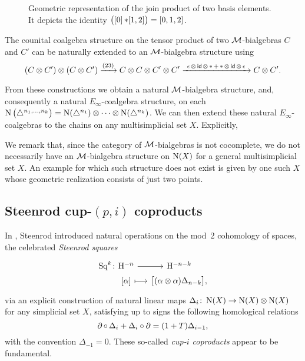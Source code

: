 \begin{figure}
	
	\caption{Geometric representation of the join product of two basis elements. It depicts the identity $\big([0] \operatorname{\ast} [1,2]\big) = [0,1,2]$.}
	\label{f:join of faces}
\end{figure}

The counital coalgebra structure on the tensor product of two $\mathcal{M}$-bialgebras $C$ and $C'$ can be naturally extended to an $\mathcal{M}$-bialgebra structure using
\[
(C \otimes C^\prime) \otimes (C \otimes C^\prime) \xrightarrow{(23)}
C \otimes C \otimes C^\prime \otimes C^\prime
\xrightarrow{\ \operatorname{\epsilon} \otimes \, \mathsf{id} \, \otimes \, \operatorname{\ast} + \operatorname{\ast} \otimes \, \mathsf{id} \, \otimes \,\operatorname{\epsilon}\ }
C \otimes C^\prime.
\]

From these constructions we obtain a natural $\mathcal{M}$-bialgebra structure, and, consequently a natural $E_\infty$-coalgebra structure, on each $\operatorname{N} \big( \triangle^{n_1, \dots, n_k} \big) = \operatorname{N}(\triangle^{n_1}) \otimes \dotsb \otimes \operatorname{N}(\triangle^{n_k})$.
We can then extend these natural $E_\infty$-coalgebras to the chains on any multisimplicial set $X$.
Explicitly, 

We remark that, since the category of $\mathcal{M}$-bialgebras is not cocomplete, we do not necessarily have an $\mathcal{M}$-bialgebra structure on $\operatorname{N}(X)$ for a general multisimplicial set $X$.
An example for which such structure does not exist is given by one such $X$ whose geometric realization consists of just two points.

\subsection{Steenrod cup-$(p,i)$ coproducts} \label{ss:cup coproducts}

In \cite{steenrod1947products}, Steenrod introduced natural operations on the mod~2 cohomology of spaces, the celebrated \textit{Steenrod squares}
\[
\begin{tikzcd} [column sep=small, row sep=0]
	\Sq^k \colon &[-20] \rH^{-n} \arrow[r] & \rH^{-n-k} \\ &
	{[\alpha]} \arrow[r, mapsto] & \big[ (\alpha \ot \alpha) \Delta_{n-k} \big],
\end{tikzcd}
\]
via an explicit construction of natural linear maps $\Delta_i \colon \operatorname{N}(X) \to \operatorname{N}(X) \otimes \operatorname{N}(X)$ for any simplicial set $X$, satisfying up to signs the following homological relations
\begin{equation} \label{e:cupi homological relations}
	\operatorname{\partial} \circ \, \Delta_i + \Delta_i \circ \operatorname{\partial} =
	(1 + T) \Delta_{i-1},
\end{equation}
with the convention $\Delta_{-1} = 0$.
These so-called \textit{cup-$i$ coproducts} appear to be fundamental.

